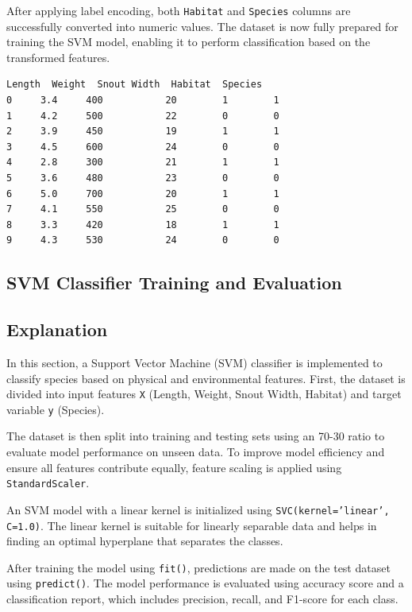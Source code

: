 \documentclass[11pt,a4paper]{report}
\makeatletter
\newcommand{\boxspacing}{\kern\kvtcb@left@rule\kern\kvtcb@boxsep}
\newcommand{\prompt}[4]{
        {\ttfamily\llap{{\color{#2}[#3]:\hspace{3pt}#4}}\vspace{-\baselineskip}}
    }
\makeatother
\begin{document}
After applying label encoding, both \texttt{Habitat} and \texttt{Species} columns are successfully converted into numeric values. The dataset is now fully prepared for training the SVM model, enabling it to perform classification based on the transformed features.
            \begin{tcolorbox}[breakable, size=fbox, boxrule=.5pt, pad at break*=1mm, opacityfill=0]
\prompt{Out}{outcolor}{3}{\boxspacing}
\begin{Verbatim}[commandchars=\\\{\}]
   Length  Weight  Snout Width  Habitat  Species
0     3.4     400           20        1        1
1     4.2     500           22        0        0
2     3.9     450           19        1        1
3     4.5     600           24        0        0
4     2.8     300           21        1        1
5     3.6     480           23        0        0
6     5.0     700           20        1        1
7     4.1     550           25        0        0
8     3.3     420           18        1        1
9     4.3     530           24        0        0
\end{Verbatim}
\end{tcolorbox}

\subsection{SVM Classifier Training and Evaluation}
\subsection*{Explanation}

In this section, a Support Vector Machine (SVM) classifier is implemented to classify species based on physical and environmental features. First, the dataset is divided into input features \texttt{X} (Length, Weight, Snout Width, Habitat) and target variable \texttt{y} (Species).

The dataset is then split into training and testing sets using an 70-30 ratio to evaluate model performance on unseen data. To improve model efficiency and ensure all features contribute equally, feature scaling is applied using \texttt{StandardScaler}.

An SVM model with a linear kernel is initialized using \texttt{SVC(kernel='linear', C=1.0)}. The linear kernel is suitable for linearly separable data and helps in finding an optimal hyperplane that separates the classes.

After training the model using \texttt{fit()}, predictions are made on the test dataset using \texttt{predict()}. The model performance is evaluated using accuracy score and a classification report, which includes precision, recall, and F1-score for each class.
        
\end{document}
